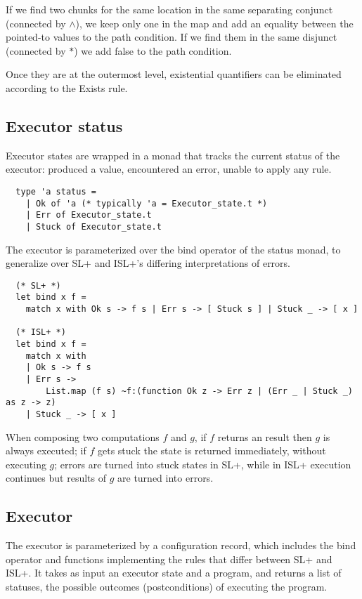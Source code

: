 \documentclass[parskip=half]{scrartcl}
\begin{document}
If we find two chunks for the same location in the same separating conjunct (\ie connected by \(\wedge\)), we keep only one in the  map and add an equality between the pointed-to values to the path condition. If we find them in the same disjunct (connected by \(\ast\)) we add false to the path condition.

Once they are at the outermost level, existential quantifiers can be eliminated according to the Exists rule.

\subsection{Executor status}

Executor states are wrapped in a monad that tracks the current status of the executor: produced a value, encountered an error, unable to apply any rule.

\begin{verbatim}
  type 'a status =
    | Ok of 'a (* typically 'a = Executor_state.t *)
    | Err of Executor_state.t
    | Stuck of Executor_state.t
\end{verbatim}

The executor is parameterized over the bind operator of the status monad, to generalize over SL+ and ISL+'s differing interpretations of errors.

\begin{verbatim}
  (* SL+ *)
  let bind x f =
    match x with Ok s -> f s | Err s -> [ Stuck s ] | Stuck _ -> [ x ]

  (* ISL+ *)
  let bind x f =
    match x with
    | Ok s -> f s
    | Err s ->
        List.map (f s) ~f:(function Ok z -> Err z | (Err _ | Stuck _) as z -> z)
    | Stuck _ -> [ x ]
\end{verbatim}

When composing two computations \(f\) and \(g\), if \(f\) returns an  result then \(g\) is always executed; if \(f\) gets stuck the state is returned immediately, without executing \(g\); errors are turned into stuck states in SL+, while in ISL+ execution continues but  results of \(g\) are turned into errors.

\subsection{Executor}

The executor is parameterized by a configuration record, which includes the bind operator and functions implementing the rules that differ between SL+ and ISL+. It takes as input an executor state and a program, and returns a list of statuses, the possible outcomes (postconditions) of executing the program.
\end{document}
